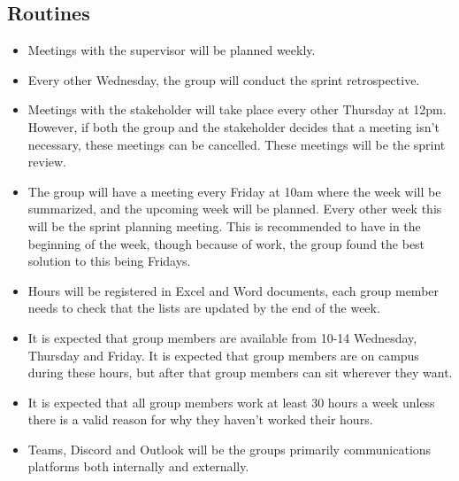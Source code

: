 \subsection{Routines}
\begin{itemize}
    \item Meetings with the supervisor will be planned weekly.
    \item Every other Wednesday, the group will conduct the sprint retrospective.
    \item Meetings with the stakeholder will take place every other Thursday at 12pm. However, if both the group and the stakeholder decides that a meeting isn't necessary, these meetings can be cancelled. These meetings will be the sprint review.
    \item The group will have a meeting every Friday at 10am where the week will be summarized, and the upcoming week will be planned. Every other week this will be the sprint planning meeting. This is recommended to have in the beginning of the week, though because of work, the group found the best solution to this being Fridays.
    \item Hours will be registered in Excel and Word documents, each group member needs to check that the lists are updated by the end of the week.
    \item It is expected that group members are available from 10-14 Wednesday, Thursday and Friday. It is expected that group members are on campus during these hours, but after that group members can sit wherever they want.
    \item It is expected that all group members work at least 30 hours a week unless there is a valid reason for why they haven't worked their hours.
    \item Teams, Discord and Outlook will be the groups primarily communications platforms both internally and externally.
\end{itemize}
 
